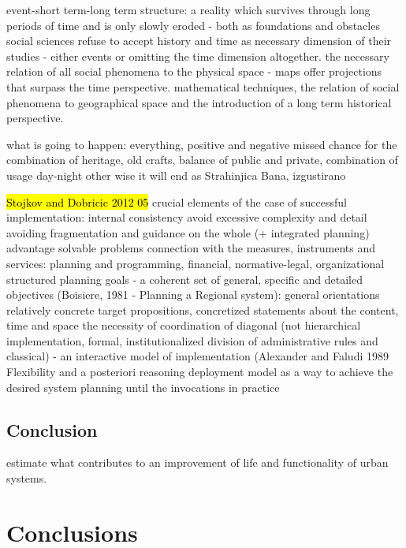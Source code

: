\documentclass[11pt]{report}
\begin{document}
\cite{Braudel 1970}
event-short term-long term
structure: a  reality which survives through long periods of time and is only slowly eroded - both as foundations and obstacles
social sciences refuse to accept history and time as necessary dimension of their studies - either events or omitting the time dimension altogether.
the necessary relation of all  social phenomena  to the physical space - maps offer projections that surpass the time perspective.
mathematical  techniques,  the  relation of social phenomena  to  geographical space and the introduction of  a  long term historical perspective.

what is going to happen: everything, positive and negative
missed chance for the combination of heritage, old crafts, balance of public and private, combination of usage day-night
other wise it will end as Strahinjica Bana, izgustirano
   
\hl{Stojkov and Dobricic 2012 05}
crucial elements of the case of successful implementation:
    internal consistency
    avoid excessive complexity and detail
    avoiding fragmentation and guidance on the whole (+ integrated planning)
    advantage solvable problems
    connection with the measures, instruments and services: planning and programming, financial, normative-legal, organizational
    structured planning goals - a coherent set of general, specific and detailed objectives (Boisiere, 1981 - Planning a Regional system): general orientations relatively concrete target propositions, concretized statements about the content, time and space
    the necessity of coordination of diagonal (not hierarchical implementation, formal, institutionalized division of administrative rules and classical) - an interactive model of implementation (Alexander and Faludi 1989
    Flexibility and a posteriori reasoning
deployment model as a way to achieve the desired system planning until the invocations in practice

\section{Conclusion}

estimate what contributes to an improvement of life and functionality of urban systems.


\chapter{Conclusions}
\end{document}
